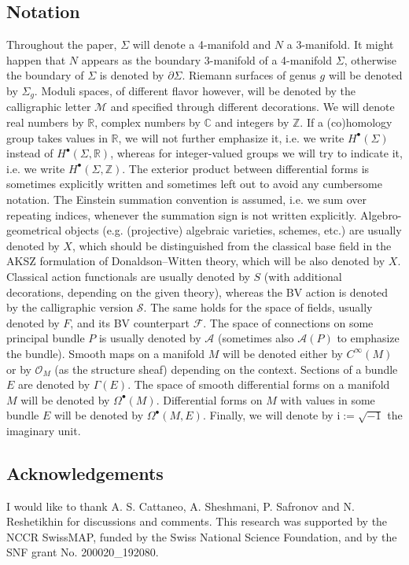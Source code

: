 \documentclass[11pt,colorinlistoftodos]{amsart}
\numberwithin{equation}{subsection}
\theoremstyle{plain}
\theoremstyle{definition}
\theoremstyle{remark}
\newcommand{\R}{\mathbb{R}}
\newcommand{\Z}{\mathbb{Z}}
\newcommand{\C}{\mathbb{C}}
\newcommand{\de}{\partial}
\newcommand{\calA}{\mathcal{A}}
\newcommand{\calS}{\mathcal{S}}
\newcommand{\calO}{\mathcal{O}}
\newcommand{\calM}{\mathcal{M}}
\newcommand{\calF}{\mathcal{F}}
\newcommand{\I}{\mathrm{i}}
\begin{document}
\subsection*{Notation}
Throughout the paper, $\Sigma$ will denote a 4-manifold and $N$ a 3-manifold. It might happen that $N$ appears as the boundary 3-manifold of a 4-manifold $\Sigma$, otherwise the boundary of $\Sigma$ is denoted by $\de\Sigma$. Riemann surfaces of genus $g$ will be denoted by $\Sigma_g$. Moduli spaces, of different flavor however, will be denoted by the calligraphic letter $\calM$ and specified through different decorations. We will denote real numbers by $\R$, complex numbers by $\C$ and integers by $\Z$.
If a (co)homology group takes values in $\R$, we will not further emphasize it, i.e. we write $H^\bullet(\Sigma)$ instead of $H^\bullet(\Sigma,\R)$, whereas for integer-valued groups we will try to indicate it, i.e. we write $H^\bullet(\Sigma,\Z)$. The exterior product between differential forms is sometimes explicitly written and sometimes left out to avoid any cumbersome notation. The Einstein summation convention is assumed, i.e. we sum over repeating indices, whenever the summation sign is not written explicitly. Algebro-geometrical objects (e.g. (projective) algebraic varieties, schemes, etc.) are usually denoted by $X$, which should be distinguished from the classical base field in the AKSZ formulation of Donaldson--Witten theory, which will be also denoted by $X$. Classical action functionals are usually denoted by $S$ (with additional decorations, depending on the given theory), whereas the BV action is denoted by the calligraphic version $\calS$. The same holds for the space of fields, usually denoted by $F$, and its BV counterpart $\calF$. The space of connections on some principal bundle $P$ is usually denoted by $\calA$ (sometimes also $\calA(P)$ to emphasize the bundle). Smooth maps on a manifold $M$ will be denoted either by $C^\infty(M)$ or by $\calO_M$ (as the structure sheaf) depending on the context. Sections of a bundle $E$ are denoted by $\Gamma(E)$.
The space of smooth differential forms on a manifold $M$ will be denoted by $\Omega^\bullet(M)$. Differential forms on $M$ with values in some bundle $E$ will be denoted by $\Omega^\bullet(M,E)$.
Finally, we will denote by $\I:=\sqrt{-1}$ the imaginary unit.  

\subsection*{Acknowledgements} I would like to thank A. S. Cattaneo, A. Sheshmani, P. Safronov and N. Reshetikhin for discussions and comments.
This research was supported by the NCCR SwissMAP, funded by the Swiss National Science Foundation, and by the SNF grant No. 200020\_192080.
\end{document}
